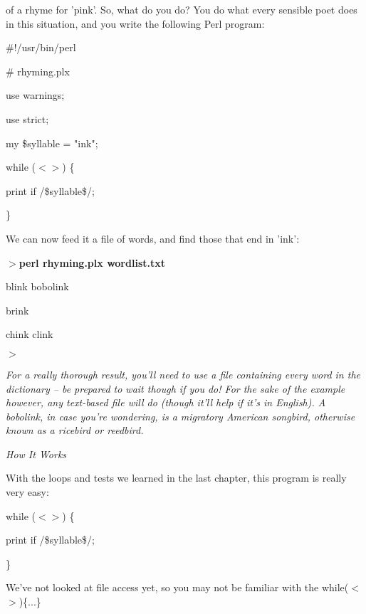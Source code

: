 \documentclass[a4paper,11pt]{book}
\begin{document}
\noindent of a rhyme for 'pink'. So, what do you do? You do what every sensible poet does in this situation, and you write the following Perl program:

\noindent 

\noindent 

\noindent \#!/usr/bin/perl

\noindent \# rhyming.plx

\noindent use warnings;

\noindent use strict;

\noindent 

\noindent my \$syllable = "ink";

\noindent while ($<$$>$) \{

\noindent print if /\$syllable\$/;

\noindent \}

\noindent 

\noindent 

\noindent We can now feed it a file of words, and find those that end in 'ink':

\noindent 

\noindent $>$\textbf{perl rhyming.plx wordlist.txt}

\noindent blink bobolink

\noindent brink

\noindent chink clink

\noindent $>$

\noindent \textit{For a really thorough result, you'll need to use a file containing every word in the dictionary -- be prepared to wait though if you do! For the sake of the example however, any text-based file will do (though it'll help if it's in English). A bobolink, in case you're wondering, is a migratory American songbird, otherwise known as a ricebird or reedbird.}

\noindent 

\noindent \textit{How It Works}

\noindent With the loops and tests we learned in the last chapter, this program is really very easy:

\noindent 

\noindent while ($<$$>$) \{

\noindent print if /\$syllable\$/;

\noindent \}

\noindent 

\noindent We've not looked at file access yet, so you may not be familiar with the while($<$$>$)\{...\}
\end{document}
